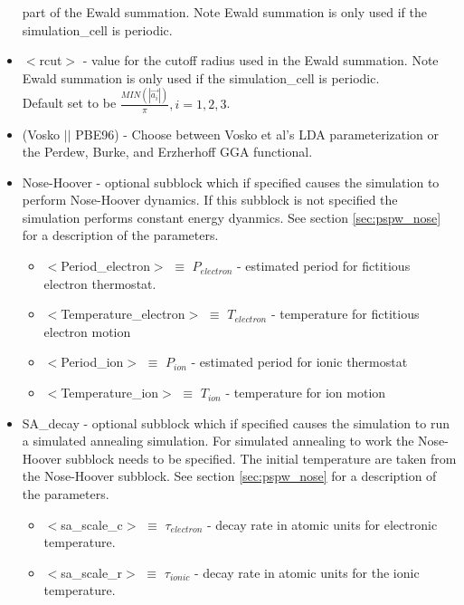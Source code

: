 \begin{itemize}
                          part of the Ewald summation. Note Ewald summation
                          is only used if the simulation\_cell is periodic.
        \item $<$rcut$>$ - value for the cutoff radius used
                          in the Ewald summation.  Note Ewald summation
                          is only used if the simulation\_cell is periodic. \\
                          Default set to be
                          $\frac{MIN(\left| \vec{a_i} \right|)}{\pi}, i=1,2,3$.
        \item (Vosko $||$ PBE96) - Choose between Vosko et al's LDA 
                               parameterization or the Perdew, Burke, 
                               and Erzherhoff GGA functional.
        \item Nose-Hoover - optional subblock which if specified
                         causes the simulation to perform Nose-Hoover dynamics.
                         If this subblock is not specified the 
                         simulation performs constant energy dyanmics.
                         See section \ref{sec:pspw_nose} for a description of the parameters.
                         \begin{itemize}
                             \item $<$Period\_electron$>$ $\equiv$ $P_{electron}$ 
                                    - estimated period for fictitious electron thermostat.
                             \item $<$Temperature\_electron$>$ $\equiv$ $T_{electron}$ 
                                    - temperature for fictitious electron motion
                             \item $<$Period\_ion$>$ $\equiv$ $P_{ion}$ 
                                    - estimated period for ionic thermostat
                             \item $<$Temperature\_ion$>$ $\equiv$ $T_{ion}$ 
                                    - temperature for ion motion
                         \end{itemize}
        \item SA\_decay - optional subblock which if specified
                         causes the simulation to run a simulated annealing simulation.
                         For simulated annealing to work the Nose-Hoover subblock needs 
                         to be specified.  The initial temperature are taken from the
                         Nose-Hoover subblock.
                         See section \ref{sec:pspw_nose} for a description of the parameters.
                         \begin{itemize}
                             \item $<$sa\_scale\_c$>$ $\equiv$ $\tau_{electron}$ 
                                    - decay rate in atomic units for electronic temperature.
                             \item $<$sa\_scale\_r$>$ $\equiv$ $\tau_{ionic}$ 
                                    - decay rate in atomic units for the ionic temperature.
                         \end{itemize}


\end{itemize}
